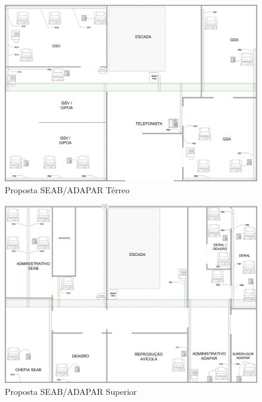 \documentclass[	DIV=calc,%
							paper=a4,%
							fontsize=12pt,%
							onecolumn]{scrartcl}	 					%
\begin{document}
\begin{figure}[H]
	\centering
	\includegraphics[height=\textwidth,width=25cm,angle=-90,keepaspectratio]{plantaseabterreonova}
	\caption{Proposta SEAB/ADAPAR Térreo}
	\label{PROPOSTA TERREO}
\end{figure}
\begin{figure}[H]
	\centering
	\includegraphics[height=\textwidth,width=25cm,angle=-90,keepaspectratio]{plantaseab1andarnova}
	\caption{Proposta SEAB/ADAPAR Superior}
	\label{PROPOSTA 1ANDAR}	
\end{figure}	
\end{document}

